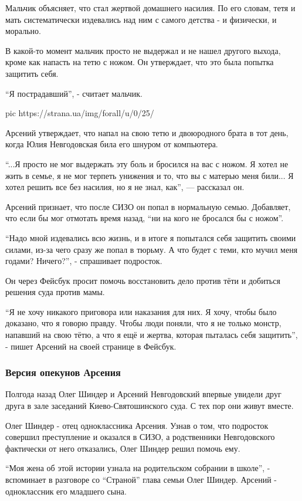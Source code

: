 Мальчик объясняет, что стал жертвой домашнего насилия. По его словам, тетя и
мать систематически издевались над ним с самого детства - и физически, и
морально.

В какой-то момент мальчик просто не выдержал и не нашел другого выхода, кроме
как напасть на тетю с ножом. Он утверждает, что это была попытка защитить себя. 

“Я пострадавший”, - считает мальчик. 

\ifcmt
pic https://strana.ua/img/forall/u/0/25/%
\fi

Арсений утверждает, что напал на свою тетю и двоюродного брата в тот день,
когда Юлия Невгодовская била его шнуром от компьютера. 

“...Я просто не мог выдержать эту боль и бросился на вас с ножом. Я хотел не
жить в семье, я не мог терпеть унижения и то, что вы с матерью меня били... Я
хотел решить все без насилия, но я не знал, как”, --- рассказал он.

Арсений признает, что после СИЗО он попал в нормальную семью. Добавляет, что
если бы мог отмотать время назад, “ни на кого не бросался бы с ножом”.

“Надо мной издевались всю жизнь, и в итоге я попытался себя защитить своими
силами, из-за чего сразу же попал в тюрьму. А что будет с теми, кто мучил меня
годами? Ничего?”, - спрашивает подросток.

Он через Фейсбук просит помочь восстановить дело против тёти и добиться решения
суда против мамы. 

“Я не хочу никакого приговора или наказания для них. Я хочу, чтобы было
доказано, что я говорю правду. Чтобы люди поняли, что я не только монстр,
напавший на свою тётю, а что я ещё и жертва, которая пыталась себя защитить”, -
пишет Арсений на своей странице в Фейсбук. 

\subsubsection{Версия опекунов Арсения}

Полгода назад Олег Шиндер и Арсений Невгодовский впервые увидели друг друга в
зале заседаний Киево-Святошинского суда. С тех пор они живут вместе. 

Олег Шиндер - отец одноклассника Арсения. Узнав о том, что подросток совершил
преступление и оказался в СИЗО, а родственники Невгодовского фактически от него
отказались, Олег Шиндер решил помочь ему. 

“Моя жена об этой истории узнала на родительском собрании в школе”, -
вспоминает в разговоре со “Страной” глава семьи Олег Шиндер. Арсений -
одноклассник его младшего сына. 

